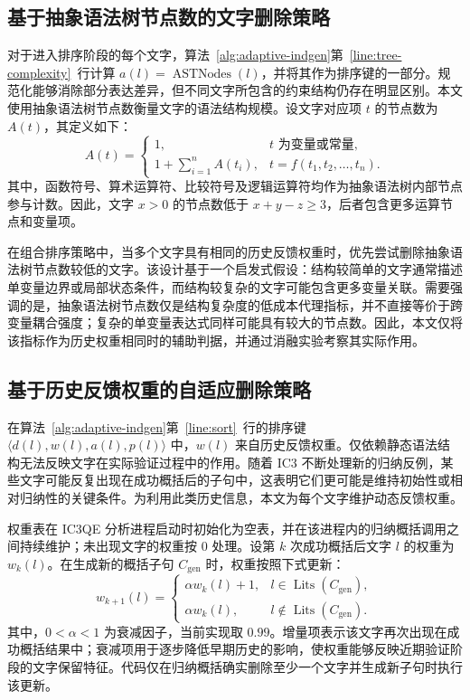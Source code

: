 \documentclass[11pt,a4paper]{article}
\newcommand{\Lits}{\operatorname{Lits}}
\newcommand{\Ast}{\operatorname{ASTNodes}}
\begin{document}
\subsection{基于抽象语法树节点数的文字删除策略}

对于进入排序阶段的每个文字，算法~\ref{alg:adaptive-indgen}第~\ref{line:tree-complexity}~行计算 $a(l)=\Ast(l)$，并将其作为排序键的一部分。规范化能够消除部分表达差异，但不同文字所包含的约束结构仍存在明显区别。本文使用抽象语法树节点数衡量文字的语法结构规模。设文字对应项 $t$ 的节点数为 $A(t)$，其定义如下：
\begin{equation}
  A(t)=
  \begin{cases}
    1, & t\text{ 为变量或常量},\\
    1+\displaystyle\sum_{i=1}^{n}A(t_i),
      & t=f(t_1,t_2,\ldots,t_n).
  \end{cases}
  \label{eq:ast-complexity}
\end{equation}
其中，函数符号、算术运算符、比较符号及逻辑运算符均作为抽象语法树内部节点参与计数。因此，文字 $x>0$ 的节点数低于 $x+y-z\geq3$，后者包含更多运算节点和变量项。

在组合排序策略中，当多个文字具有相同的历史反馈权重时，优先尝试删除抽象语法树节点数较低的文字。该设计基于一个启发式假设：结构较简单的文字通常描述单变量边界或局部状态条件，而结构较复杂的文字可能包含更多变量关联。需要强调的是，抽象语法树节点数仅是结构复杂度的低成本代理指标，并不直接等价于跨变量耦合强度；复杂的单变量表达式同样可能具有较大的节点数。因此，本文仅将该指标作为历史权重相同时的辅助判据，并通过消融实验考察其实际作用。

\subsection{基于历史反馈权重的自适应删除策略}

在算法~\ref{alg:adaptive-indgen}第~\ref{line:sort}~行的排序键 $\langle d(l),w(l),a(l),p(l)\rangle$ 中，$w(l)$ 来自历史反馈权重。仅依赖静态语法结构无法反映文字在实际验证过程中的作用。随着 IC3 不断处理新的归纳反例，某些文字可能反复出现在成功概括后的子句中，这表明它们更可能是维持初始性或相对归纳性的关键条件。为利用此类历史信息，本文为每个文字维护动态反馈权重。

权重表在 IC3QE 分析进程启动时初始化为空表，并在该进程内的归纳概括调用之间持续维护；未出现文字的权重按 $0$ 处理。设第 $k$ 次成功概括后文字 $l$ 的权重为 $w_k(l)$。在生成新的概括子句 $C_{\mathrm{gen}}$ 时，权重按照下式更新：
\begin{equation}
  w_{k+1}(l)=
  \begin{cases}
    \alpha w_k(l)+1, & l\in \Lits(C_{\mathrm{gen}}),\\
    \alpha w_k(l),   & l\notin \Lits(C_{\mathrm{gen}}).
  \end{cases}
  \label{eq:weight-update}
\end{equation}
其中，$0<\alpha<1$ 为衰减因子，当前实现取 $0.99$。增量项表示该文字再次出现在成功概括结果中；衰减项用于逐步降低早期历史的影响，使权重能够反映近期验证阶段的文字保留特征。代码仅在归纳概括确实删除至少一个文字并生成新子句时执行该更新。
\end{document}
